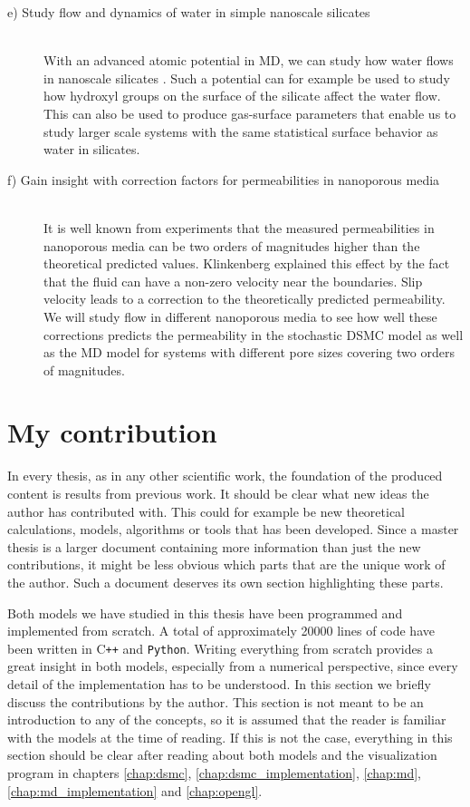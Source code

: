 \begin{description}
  \item[e) Study flow and dynamics of water in simple nanoscale silicates] \hfill \\
  With an advanced atomic potential in MD, we can study how water flows in nanoscale silicates \cite{vashishta1990interaction}. Such a potential can for example be used to study how hydroxyl groups on the surface of the silicate affect the water flow. This can also be used to produce gas-surface parameters that enable us to study larger scale systems with the same statistical surface behavior as water in silicates. 
  \item[f) Gain insight with correction factors for permeabilities in nanoporous media] \hfill \\
  It is well known from experiments that the measured permeabilities in nanoporous media can be two orders of magnitudes higher than the theoretical predicted values. Klinkenberg explained this effect by the fact that the fluid can have a non-zero velocity near the boundaries\cite{klinkenberg1941permeability}. Slip velocity leads to a correction to the theoretically predicted permeability. We will study flow in different nanoporous media to see how well these corrections predicts the permeability in the stochastic DSMC model as well as the MD model for systems with different pore sizes covering two orders of magnitudes.
\end{description}

\section{My contribution}
\label{sec:my_contributions}
In every thesis, as in any other scientific work, the foundation of the produced content is results from previous work. It should be clear what new ideas the author has contributed with. This could for example be new theoretical calculations, models, algorithms or tools that has been developed. Since a master thesis is a larger document containing more information than just the new contributions, it might be less obvious which parts that are the unique work of the author. Such a document deserves its own section highlighting these parts.

Both models we have studied in this thesis have been programmed and implemented from scratch. A total of approximately 20000 lines of code have been written in C{}\verb!++! and \verb!Python!. Writing everything from scratch provides a great insight in both models, especially from a numerical perspective, since every detail of the implementation has to be understood. In this section we briefly discuss the contributions by the author. This section is not meant to be an introduction to any of the concepts, so it is assumed that the reader is familiar with the models at the time of reading. If this is not the case, everything in this section should be clear after reading about both models and the visualization program in chapters \ref{chap:dsmc}, \ref{chap:dsmc_implementation}, \ref{chap:md}, \ref{chap:md_implementation} and \ref{chap:opengl}.
